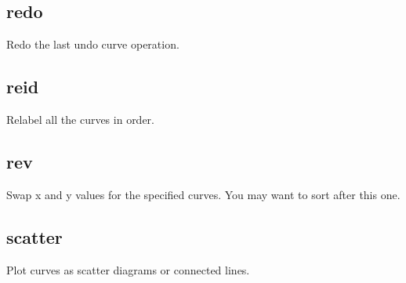 \documentclass[letterpaper,10pt,english]{sphinxmanual}
\begin{document}
\subsection{redo}
\label{\detokenize{curve_control_cmds:redo}}
Redo the last undo curve operation.

\begin{sphinxVerbatim}[commandchars=\\\{\}]
\PYG{p}{[}\PYG{p}{]} 
\end{sphinxVerbatim}


\subsection{reid}
\label{\detokenize{curve_control_cmds:reid}}
Relabel all the curves in order. 

\begin{sphinxVerbatim}[commandchars=\\\{\}]
\PYG{p}{[}\PYG{p}{]} 
\end{sphinxVerbatim}


\subsection{rev}
\label{\detokenize{curve_control_cmds:rev}}
Swap x and y values for the specified curves. You may want to sort after this one.

\begin{sphinxVerbatim}[commandchars=\\\{\}]
\PYG{p}{[}\PYG{p}{]}  
\end{sphinxVerbatim}


\subsection{scatter}
\label{\detokenize{curve_control_cmds:scatter}}
Plot curves as scatter diagrams or connected lines.

\begin{sphinxVerbatim}[commandchars=\\\{\}]
\PYG{p}{[}\PYG{p}{]}     
\end{sphinxVerbatim}
\end{document}

